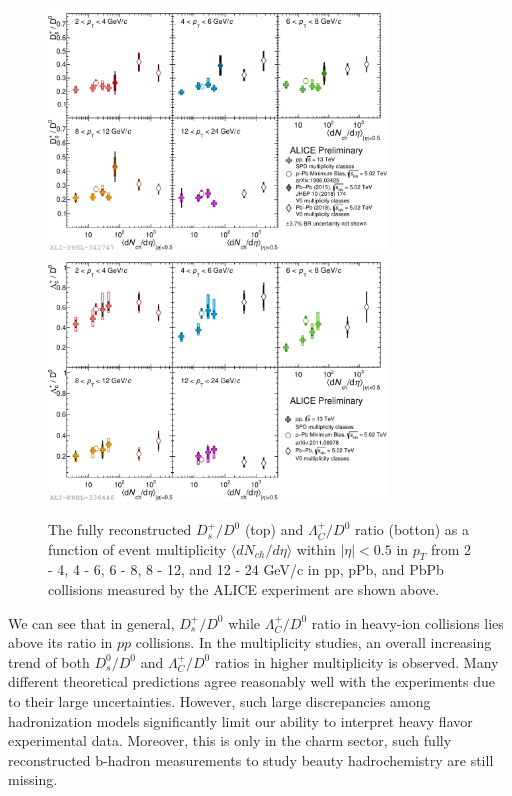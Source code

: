 \begin{figure}[hbtp]
\begin{center}
\includegraphics[width=0.80\textwidth]{Figures/Chapter2/ALICEDsD0Multi.pdf}
\includegraphics[width=0.80\textwidth]{Figures/Chapter2/ALICELambdaD0Multi.pdf}
\caption{The fully reconstructed $D^+_s/D^0$ (top) and $\Lambda_C^+/D^0$ ratio (botton) as a function of event multiplicity $\langle dN_{ch}/d\eta \rangle$ within $|\eta| < 0.5$ in $p_T$ from 2 - 4, 4 - 6, 6 - 8, 8 - 12, and 12 - 24 GeV/c in pp, pPb, and PbPb collisions measured by the ALICE experiment are shown above.}
\label{ALICEMulti}
\end{center}
\end{figure}   



We can see that in general, $D_s^+/D^0$ while $\Lambda_C^+/D^0$ ratio in heavy-ion collisions lies above its ratio in $pp$ collisions. In the multiplicity studies, an overall increasing trend of both $D^0_s/D^0$ and $\Lambda_C^+/D^0$ ratios in higher multiplicity is observed. Many different theoretical predictions agree reasonably well with the experiments due to their large uncertainties. However, such large discrepancies among hadronization models significantly limit our ability to interpret heavy flavor experimental data. Moreover, this is only in the charm sector, such fully reconstructed b-hadron measurements to study beauty hadrochemistry are still missing. 


